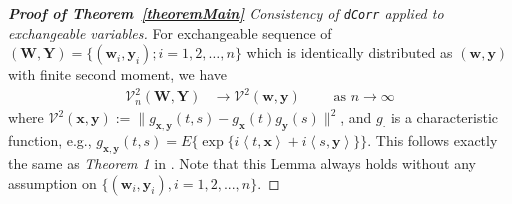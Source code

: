 \documentclass[11pt]{article}
\theoremstyle{definition}
\begin{document}
\begin{proof}[\textbf{Proof of Theorem~\ref{theoremMain}} Consistency of \texttt{dCorr} applied to exchangeable variables]
	\bigskip
	
	For exchangeable sequence of $(\mathbf{W}, \mathbf{Y}) = \{ (\mathbf{w}_{i}, \mathbf{y}_{i}) ; i = 1,2, \ldots, n \}$ which is identically distributed as $(\mathbf{w}, \mathbf{y})$ with finite second moment,  we have 
	\begin{eqnarray}
	\mathcal{V}_{n}^{2}(\mathbf{W},\mathbf{Y}) &\longrightarrow \mathcal{V}^{2}(\mathbf{w},\mathbf{y}) \quad \quad \mbox{ as } n \rightarrow \infty
	\label{eq:conv1}
	\end{eqnarray}
	where $\mathcal{V}^{2} (\mathbf{x},\mathbf{y}) := \| g_{\mathbf{x},\mathbf{y}}(t,s) - g_{\mathbf{x}}(t) g_{\mathbf{y}}(s) \|^2$, and $g_{\cdot}$ is a characteristic function, e.g., $g_{\mathbf{x},\mathbf{y}}(t,s) = E\{\exp\{i \left\langle t,\mathbf{x} \right\rangle  +i \left\langle  s,\mathbf{y}\right\rangle \}\}$. This follows exactly the same as \textit{Theorem 1} in \cite{szekely2007measuring}. Note that this Lemma always holds without any assumption on $\{(\mathbf{w}_{i},\mathbf{y}_{i}), i=1,2,...,n\}$.



\end{proof}
\end{document}
